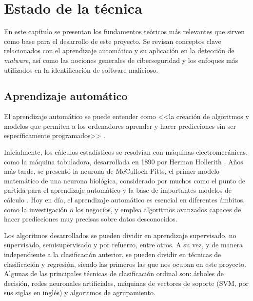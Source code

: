 \chapter{Estado de la técnica}
\label{ch:estado_tecnica}

En este capítulo se presentan los fundamentos teóricos más relevantes que sirven como base para el desarrollo de este proyecto. Se revisan conceptos clave relacionados con el aprendizaje automático y su aplicación en la detección de \textit{malware}, así como las nociones generales de ciberseguridad y los enfoques más utilizados en la identificación de software malicioso.

\section{Aprendizaje automático}
\label{sec:aprend_auto}

El aprendizaje automático se puede entender como <<la creación de algoritmos y modelos que permiten a los ordenadores aprender y hacer predicciones sin ser específicamente programados>> \cite{mwclass}.

\vspace{1em}

Inicialmente, los cálculos estadísticos se resolvían con máquinas electromecánicas, como la máquina tabuladora, desarrollada en 1890 por Herman Hollerith \cite{maquina_tabuladora}. Años más tarde, se presentó la neurona de McCulloch-Pitts, el primer modelo matemático de una neurona biológica, considerado por muchos como el punto de partida para el aprendizaje automático y la base de importantes modelos de cálculo \cite{inproceedings}. Hoy en día, el aprendizaje automático es esencial en diferentes ámbitos, como la investigación o los negocios, y emplea algoritmos avanzados capaces de hacer predicciones muy precisas sobre datos desconocidos.

\vspace{1em}

Los algoritmos desarrollados se pueden dividir en aprendizaje supervisado, no supervisado, semisupervisado y por refuerzo, entre otros. A su vez, y de manera independiente a la clasificación anterior, se pueden dividir en técnicas de clasificación y regresión, siendo las primeros las que nos ocupan en este proyecto. Algunas de las principales técnicas de clasificación ordinal son: árboles de decisión, redes neuronales artificiales, máquinas de vectores de soporte (SVM, por sus siglas en inglés) y algoritmos de agrupamiento.

